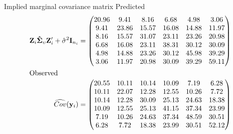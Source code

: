 \documentclass[aspectratio=169]{beamer}
\newcommand{\vect}[1]{\mathbf{#1}}
\newcommand{\mat}[1]{\mathbf{#1}}
\newcommand{\gmat}[1]{\boldsymbol{#1}}
\begin{document}
\begin{frame}[fragile]{Implied marginal covariance matrix}
Predicted
\begin{align*}
  \mat{Z}_i \gmat{\hat\Sigma}_\upsilon \mat{Z}'_i +
    \hat\sigma^2 \mat{I}_{n_i} &= 
  \begin{pmatrix}
    20.96 & 9.41 & 8.16 & 6.68 & 4.98 & 3.06 \\ 
    9.41 & 23.86 & 15.57 & 16.08 & 14.88 & 11.97 \\ 
    8.16 & 15.57 & 31.07 & 23.11 & 23.26 & 20.98 \\ 
    6.68 & 16.08 & 23.11 & 38.31 & 30.12 & 30.09 \\ 
    4.98 & 14.88 & 23.26 & 30.12 & 45.98 & 39.29 \\ 
    3.06 & 11.97 & 20.98 & 30.09 & 39.29 & 59.11
  \end{pmatrix}\\
  \intertext{Observed}
  \widehat{Cov}(\vect{y}_i) &=
  \begin{pmatrix}
    20.55 & 10.11 & 10.14 & 10.09 & 7.19 & 6.28 \\ 
    10.11 & 22.07 & 12.28 & 12.55 & 10.26 & 7.72 \\ 
    10.14 & 12.28 & 30.09 & 25.13 & 24.63 & 18.38 \\ 
    10.09 & 12.55 & 25.13 & 41.15 & 37.34 & 23.99 \\ 
    7.19 & 10.26 & 24.63 & 37.34 & 48.59 & 30.51 \\ 
    6.28 & 7.72 & 18.38 & 23.99 & 30.51 & 52.12 \\ 
  \end{pmatrix}\\
\end{align*}
% 
% 
% 
\end{frame}
\end{document}
